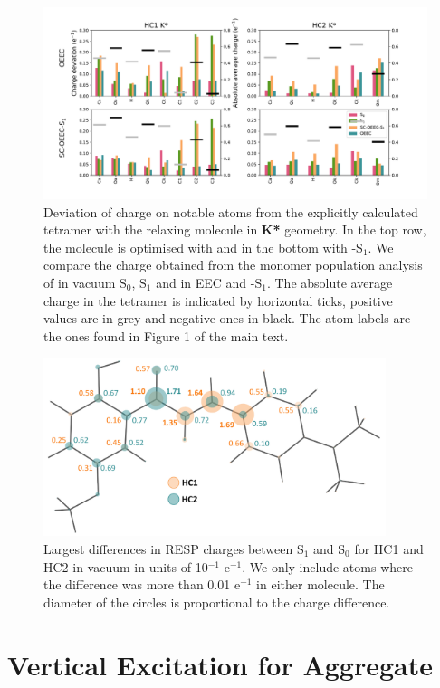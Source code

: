 \begin{figure}[H]
\includegraphics[width=\textwidth]{Appendices/A/just_K.pdf}
\caption{Deviation of charge on notable atoms from the explicitly calculated tetramer with the relaxing molecule in \textbf{K*} geometry. In the top row, the molecule is optimised with \EEC{} and in the bottom with \SCEEC{}-S$_1$. We compare the charge obtained from the monomer population analysis of in vacuum S$_0$, S$_1$ and in EEC and \SCEEC{}-S$_1$. The absolute average charge in the tetramer is indicated by horizontal ticks, positive values are in grey and negative ones in black. The atom labels are the ones found in Figure 1 of the main text.}
\label{fig:chargesK}
\end{figure}


\begin{figure}[H]
\centering
\includegraphics[width=10cm]{Appendices/A/charge_diff.pdf}
\caption{Largest differences in RESP charges between S$_1$ and S$_0$ for HC1 and HC2 in vacuum in units of 10$^{-1}$ e$^{-1}$. We only include atoms where the difference was more than 0.01 e$^{-1}$ in either molecule. The diameter of the circles is proportional to the charge difference.}
\label{fig:char_diff}
\end{figure}
\section{Vertical Excitation for Aggregate}
\label{app:sec:tetramer_vert}

